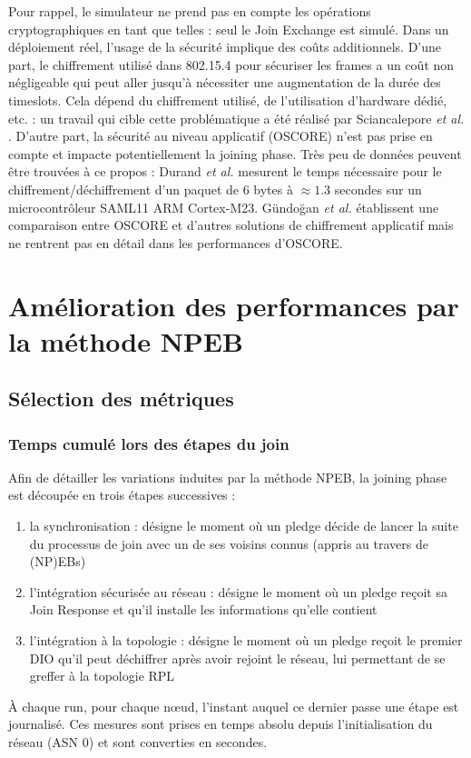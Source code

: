 \documentclass[]{report}
\begin{document}
 Pour rappel, le simulateur ne prend pas en compte les opérations cryptographiques en tant que telles : seul le Join Exchange est simulé. Dans un déploiement réel, l'usage de la sécurité implique des coûts additionnels. D'une part, le chiffrement utilisé dans 802.15.4 pour sécuriser les frames a un coût non négligeable qui peut aller jusqu'à nécessiter une augmentation de la durée des timeslots. Cela dépend du chiffrement utilisé, de l'utilisation d'hardware dédié, etc. : un travail qui cible cette problématique a été réalisé par Sciancalepore \textit{et al.} \cite{link-layer-sec-impact}. D'autre part, la sécurité au niveau applicatif (OSCORE) n'est pas prise en compte et impacte potentiellement la joining phase. Très peu de données peuvent être trouvées à ce propos : Durand \textit{et al.} \cite{OSCOREtimes} mesurent le temps nécessaire pour le chiffrement/déchiffrement d'un paquet de 6 bytes à $\approx 1.3$ secondes sur un microcontrôleur SAML11 ARM Cortex-M23. Gündoğan \textit{et al.} \cite{OSCOREvsNDN} établissent une comparaison entre OSCORE et d'autres solutions de chiffrement applicatif mais ne rentrent pas en détail dans les performances d'OSCORE.

\newpage

\section{Amélioration des performances par la méthode NPEB}
\label{eval_NPEB}


\subsection{Sélection des métriques}

\subsubsection{Temps cumulé lors des étapes du join}
\label{metric_times}

Afin de détailler les variations induites par la méthode NPEB, la joining phase est découpée en trois étapes successives :
\begin{enumerate}
\item la synchronisation : désigne le moment où un pledge décide de lancer la suite du processus de join avec un de ses voisins connus (appris au travers de (NP)EBs)
\item l'intégration sécurisée au réseau : désigne le moment où un pledge reçoit sa Join Response et qu'il installe les informations qu'elle contient
\item l'intégration à la topologie : désigne le moment où un pledge reçoit le premier DIO qu'il peut déchiffrer après avoir rejoint le réseau, lui permettant de se greffer à la topologie RPL
\end{enumerate}
\vspace{0.2cm}
À chaque run, pour chaque nœud, l'instant auquel ce dernier passe une étape est journalisé. Ces mesures sont prises en temps absolu depuis l'initialisation du réseau (ASN 0) et sont converties en secondes.
\end{document}
